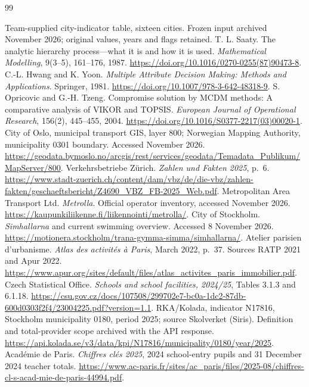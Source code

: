 \begin{thebibliography}{99}
\raggedright
{} Team-supplied city-indicator table, sixteen cities.
Frozen input archived November 2026; original values, years and flags retained.
 T. L. Saaty. The analytic hierarchy process---what it is and
how it is used. \textit{Mathematical Modelling}, 9(3--5), 161--176, 1987.
\url{https://doi.org/10.1016/0270-0255(87)90473-8}.
 C.-L. Hwang and K. Yoon. \textit{Multiple Attribute Decision
Making: Methods and Applications}. Springer, 1981.
\url{https://doi.org/10.1007/978-3-642-48318-9}.
 S. Opricovic and G.-H. Tzeng. Compromise solution by MCDM
methods: A comparative analysis of VIKOR and TOPSIS.
\textit{European Journal of Operational Research}, 156(2), 445--455, 2004.
\url{https://doi.org/10.1016/S0377-2217(03)00020-1}.
 City of Oslo, municipal transport GIS, layer 800; Norwegian
Mapping Authority, municipality 0301 boundary. Accessed November 2026.
\url{https://geodata.bymoslo.no/arcgis/rest/services/geodata/Temadata_Publikum/MapServer/800}.
 Verkehrsbetriebe Z\"urich. \textit{Zahlen und Fakten 2025}, p.~6.
\url{https://www.stadt-zuerich.ch/content/dam/vbz/de/die-vbz/zahlen-fakten/geschaeftsbericht/Z4690_VBZ_FB-2025_Web.pdf}.
 Metropolitan Area Transport Ltd. \textit{Metrolla}.
Official operator inventory, accessed November 2026.
\url{https://kaupunkiliikenne.fi/liikennointi/metrolla/}.
 City of Stockholm. \textit{Simhallarna} and current swimming
overview. Accessed 8 November 2026.
\url{https://motionera.stockholm/trana-gymma-simma/simhallarna/}.
 Atelier parisien d'urbanisme. \textit{Atlas des activit\'es \`a
Paris}, March 2022, p.~37. Sources RATP 2021 and Apur 2022.
\url{https://www.apur.org/sites/default/files/atlas_activites_paris_immobilier.pdf}.
 Czech Statistical Office. \textit{Schools and school facilities,
2024/25}, Tables 3.1.3 and 6.1.18.
\url{https://csu.gov.cz/docs/107508/299702e7-bc0a-1dc2-87db-600d0303f2f4/23004225.pdf?version=1.1}.
 RKA/Kolada, indicator N17816, Stockholm municipality 0180,
period 2025; source Skolverket (Siris). Definition and total-provider scope
archived with the API response.
\url{https://api.kolada.se/v3/data/kpi/N17816/municipality/0180/year/2025}.
 Acad\'emie de Paris. \textit{Chiffres cl\'es 2025},
2024 school-entry pupils and 31 December 2024 teacher totals.
\url{https://www.ac-paris.fr/sites/ac_paris/files/2025-08/chiffres-cl-s-acad-mie-de-paris-44994.pdf}.

\end{thebibliography}
